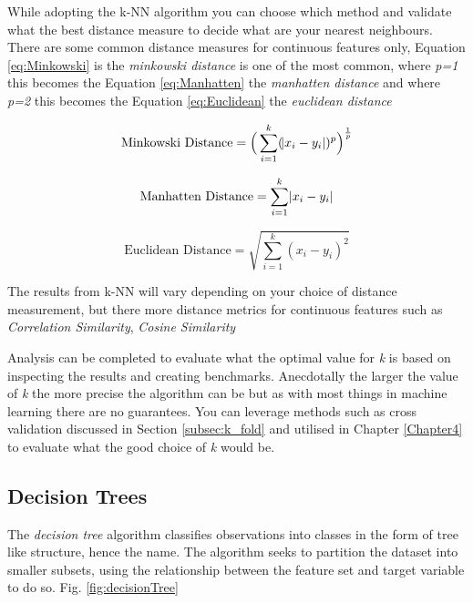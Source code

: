 While adopting the k-NN algorithm you can choose which method and validate what the best distance measure to decide what are your nearest neighbours. There are some common distance measures for continuous features only, Equation \ref{eq:Minkowski} is the \textit{minkowski distance} is one of the most common, where \textit{p=1} this becomes the Equation \ref{eq:Manhatten} the \textit{manhatten distance} and where \textit{p=2} this becomes the Equation \ref{eq:Euclidean} the \textit{euclidean distance}

\begin{equation} \label{eq:Minkowski}
	\text{Minkowski Distance}   = \Big(\sum_{i=1}^k (\abs{x_i-y_i})^p\Big)^\frac{1}{p}
\end{equation}

\begin{equation} \label{eq:Manhatten}
	\text{Manhatten Distance}   = \sum_{i=1}^k \abs{x_i-y_i}
\end{equation}

\begin{equation} \label{eq:Euclidean}
	\text{Euclidean Distance}   = \sqrt{\sum_{i=1}^k (x_i-y_i)^2}
\end{equation}

The results from k-NN will vary depending on your choice of distance measurement, but there more distance metrics for continuous features such as \textit{Correlation Similarity}, \textit{Cosine Similarity} \citep{sarwar_item-based_2001}

Analysis can be completed to evaluate what the optimal value for \textit{k} is based on inspecting the results and creating benchmarks. Anecdotally the larger the value of \textit{k} the more precise the algorithm can be but as with most things in machine learning there are no guarantees. You can leverage methods such as cross validation discussed in Section \ref{subsec:k_fold} and utilised in Chapter \ref{Chapter4} to evaluate what the good choice of \textit{k} would be.

\subsection{Decision Trees} \label{decTrees}
The \textit{decision tree} algorithm classifies observations into classes in the form of tree like structure, hence the name. The algorithm seeks to partition the dataset into smaller subsets, using the relationship between the feature set and target variable to do so. Fig. \ref{fig:decisionTree}

